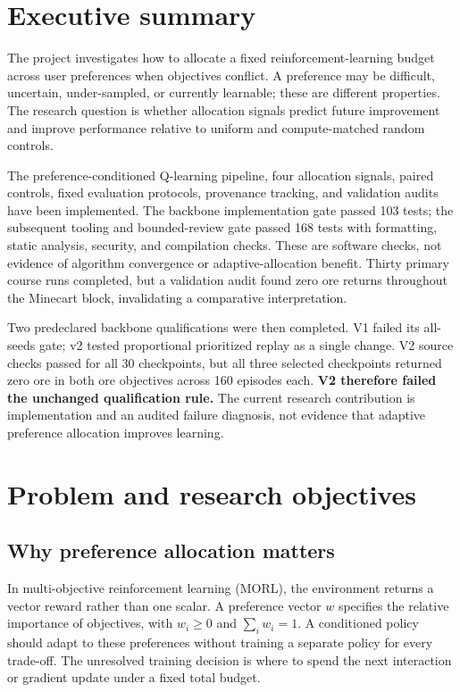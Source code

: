 \section{Executive summary}

The project investigates how to allocate a fixed reinforcement-learning budget
across user preferences when objectives conflict. A preference may be difficult,
uncertain, under-sampled, or currently learnable; these are different properties.
The research question is whether allocation signals predict future improvement
and improve performance relative to uniform and compute-matched random controls.

The preference-conditioned Q-learning pipeline, four allocation signals, paired
controls, fixed evaluation protocols, provenance tracking, and validation audits
have been implemented. The backbone implementation gate passed 103 tests;
the subsequent tooling and bounded-review gate passed 168 tests with formatting,
static analysis, security, and compilation checks. These are software checks,
not evidence of algorithm convergence or adaptive-allocation benefit.
Thirty primary course runs completed, but a validation audit found zero ore
returns throughout the Minecart block, invalidating a comparative interpretation.

Two predeclared backbone qualifications were then completed. V1 failed its
all-seeds gate; v2 tested proportional prioritized replay as a single change.
V2 source checks passed for all 30 checkpoints, but all three selected
checkpoints returned zero ore in both ore objectives across 160 episodes each.
\textbf{V2 therefore failed the unchanged qualification rule.} The current
research contribution is implementation and an audited failure diagnosis, not
evidence that adaptive preference allocation improves learning.

\section{Problem and research objectives}

\subsection{Why preference allocation matters}
In multi-objective reinforcement learning (MORL), the environment returns a
vector reward rather than one scalar. A preference vector $w$ specifies the
relative importance of objectives, with $w_i\geq0$ and $\sum_iw_i=1$.
A conditioned policy should adapt to these preferences without training a
separate policy for every trade-off. The unresolved training decision is where
to spend the next interaction or gradient update under a fixed total budget.

